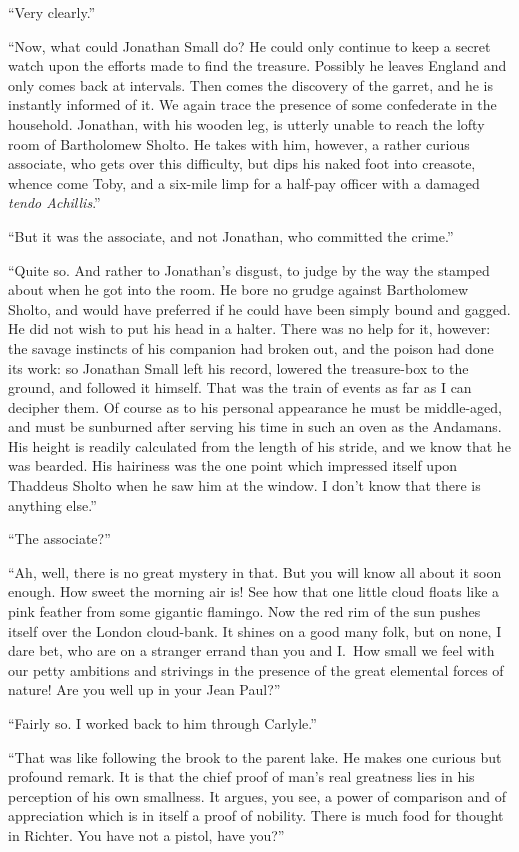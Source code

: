 \documentclass[12pt,english,oneside]{book}
\begin{document}
{}``Very clearly.''

{}``Now, what could Jonathan Small do? He could only continue to
keep a secret watch upon the efforts made to find the treasure. Possibly
he leaves England and only comes back at intervals. Then comes the
discovery of the garret, and he is instantly informed of it. We again
trace the presence of some confederate in the household. Jonathan,
with his wooden leg, is utterly unable to reach the lofty room of
Bartholomew Sholto. He takes with him, however, a rather curious associate,
who gets over this difficulty, but dips his naked foot into creasote,
whence come Toby, and a six-mile limp for a half-pay officer with
a damaged \emph{tendo Achillis}.''

{}``But it was the associate, and not Jonathan, who committed the
crime.''

{}``Quite so. And rather to Jonathan's disgust, to judge by the way
the stamped about when he got into the room. He bore no grudge against
Bartholomew Sholto, and would have preferred if he could have been
simply bound and gagged. He did not wish to put his head in a halter.
There was no help for it, however: the savage instincts of his companion
had broken out, and the poison had done its work: so Jonathan Small
left his record, lowered the treasure-box to the ground, and followed
it himself. That was the train of events as far as I can decipher
them. Of course as to his personal appearance he must be middle-aged,
and must be sunburned after serving his time in such an oven as the
Andamans. His height is readily calculated from the length of his
stride, and we know that he was bearded. His hairiness was the one
point which impressed itself upon Thaddeus Sholto when he saw him
at the window. I don't know that there is anything else.''

{}``The associate?''

{}``Ah, well, there is no great mystery in that. But you will know
all about it soon enough. How sweet the morning air is! See how that
one little cloud floats like a pink feather from some gigantic flamingo.
Now the red rim of the sun pushes itself over the London cloud-bank.
It shines on a good many folk, but on none, I dare bet, who are on
a stranger errand than you and I.\  How small we feel with our petty
ambitions and strivings in the presence of the great elemental forces
of nature! Are you well up in your Jean Paul?''

{}``Fairly so. I worked back to him through Carlyle.''

{}``That was like following the brook to the parent lake. He makes
one curious but profound remark. It is that the chief proof of man's
real greatness lies in his perception of his own smallness. It argues,
you see, a power of comparison and of appreciation which is in itself
a proof of nobility. There is much food for thought in Richter. You
have not a pistol, have you?''
\end{document}
